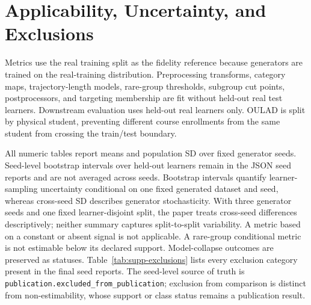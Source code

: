 \documentclass[10pt]{article}
\begin{document}
\section{Applicability, Uncertainty, and Exclusions}

Metrics use the real training split as the fidelity reference because
generators are trained on the real-training distribution. Preprocessing transforms, category
maps, trajectory-length models, rare-group thresholds, subgroup cut points,
postprocessors, and targeting membership are fit without held-out real test
learners.  Downstream evaluation uses held-out real learners only.  OULAD is
split by physical student, preventing different course enrollments from the
same student from crossing the train/test boundary.

All numeric tables report means and population SD over fixed generator seeds.
Seed-level bootstrap intervals over held-out learners remain in the JSON seed
reports and are not averaged across seeds. Bootstrap intervals quantify
learner-sampling uncertainty conditional on one fixed generated dataset and
seed, whereas cross-seed SD describes generator stochasticity. With three
generator seeds and one fixed learner-disjoint split, the paper treats
cross-seed differences descriptively; neither summary captures split-to-split
variability. A metric based on a constant or absent signal is not applicable. A
rare-group conditional metric is not estimable below its declared support.
Model-collapse outcomes are preserved as statuses. Table~\ref{tab:supp-exclusions}
lists every exclusion category present in the final seed reports. The
seed-level source of truth is
\texttt{publication.excluded\_from\_publication}; exclusion from comparison is
distinct from non-estimability, whose support or class status remains a
publication result.
\end{document}
